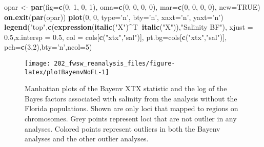 \documentclass[11pt,]{article}
\newenvironment{Shaded}{\begin{snugshade}}{\end{snugshade}}
\newcommand{\KeywordTok}[1]{\textcolor[rgb]{0.13,0.29,0.53}{\textbf{#1}}}
\newcommand{\DataTypeTok}[1]{\textcolor[rgb]{0.13,0.29,0.53}{#1}}
\newcommand{\DecValTok}[1]{\textcolor[rgb]{0.00,0.00,0.81}{#1}}
\newcommand{\FloatTok}[1]{\textcolor[rgb]{0.00,0.00,0.81}{#1}}
\newcommand{\StringTok}[1]{\textcolor[rgb]{0.31,0.60,0.02}{#1}}
\newcommand{\OtherTok}[1]{\textcolor[rgb]{0.56,0.35,0.01}{#1}}
\newcommand{\OperatorTok}[1]{\textcolor[rgb]{0.81,0.36,0.00}{\textbf{#1}}}
\newcommand{\NormalTok}[1]{#1}
\begin{document}
\begin{Shaded}
\begin{Highlighting}[]
\NormalTok{opar <-}\StringTok{ }\KeywordTok{par}\NormalTok{(}\DataTypeTok{fig=}\KeywordTok{c}\NormalTok{(}\DecValTok{0}\NormalTok{, }\DecValTok{1}\NormalTok{, }\DecValTok{0}\NormalTok{, }\DecValTok{1}\NormalTok{), }\DataTypeTok{oma=}\KeywordTok{c}\NormalTok{(}\DecValTok{0}\NormalTok{, }\DecValTok{0}\NormalTok{, }\DecValTok{0}\NormalTok{, }\DecValTok{0}\NormalTok{),}
            \DataTypeTok{mar=}\KeywordTok{c}\NormalTok{(}\DecValTok{0}\NormalTok{, }\DecValTok{0}\NormalTok{, }\DecValTok{0}\NormalTok{, }\DecValTok{0}\NormalTok{), }\DataTypeTok{new=}\OtherTok{TRUE}\NormalTok{)}
\KeywordTok{on.exit}\NormalTok{(}\KeywordTok{par}\NormalTok{(opar))}
\KeywordTok{plot}\NormalTok{(}\DecValTok{0}\NormalTok{, }\DecValTok{0}\NormalTok{, }\DataTypeTok{type=}\StringTok{'n'}\NormalTok{, }\DataTypeTok{bty=}\StringTok{'n'}\NormalTok{, }\DataTypeTok{xaxt=}\StringTok{'n'}\NormalTok{, }\DataTypeTok{yaxt=}\StringTok{'n'}\NormalTok{)}
\KeywordTok{legend}\NormalTok{(}\StringTok{"top"}\NormalTok{,}\KeywordTok{c}\NormalTok{(}\KeywordTok{expression}\NormalTok{(}\KeywordTok{italic}\NormalTok{(}\StringTok{"X"}\NormalTok{)}\OperatorTok{^}\NormalTok{T}\OperatorTok{~}\KeywordTok{italic}\NormalTok{(}\StringTok{"X"}\NormalTok{)),}\StringTok{"Salinity BF"}\NormalTok{),}
       \DataTypeTok{xjust =} \FloatTok{0.5}\NormalTok{,}\DataTypeTok{x.intersp =} \FloatTok{0.5}\NormalTok{,}
       \DataTypeTok{col =}\NormalTok{ cols[}\KeywordTok{c}\NormalTok{(}\StringTok{"xtx"}\NormalTok{,}\StringTok{"sal"}\NormalTok{)],}
       \DataTypeTok{pt.bg=}\NormalTok{cols[}\KeywordTok{c}\NormalTok{(}\StringTok{"xtx"}\NormalTok{,}\StringTok{"sal"}\NormalTok{)],}
       \DataTypeTok{pch=}\KeywordTok{c}\NormalTok{(}\DecValTok{3}\NormalTok{,}\DecValTok{2}\NormalTok{),}\DataTypeTok{bty=}\StringTok{'n'}\NormalTok{,}\DataTypeTok{ncol=}\DecValTok{5}\NormalTok{)}
\end{Highlighting}
\end{Shaded}

\begin{figure}[H]
\texttt{[image: 202\_fwsw\_reanalysis\_files/figure-latex/plotBayenvNoFL-1]} \caption{Manhattan plots of the Bayenv XTX statistic and the log of the Bayes factors associated with salinity from the analysis without the Florida populations. Shown are only loci that mapped to regions on chromosomes. Grey points represent loci that are not outlier in any analyses. Colored points represent outliers in both the Bayenv analyses and the other outlier analyses.}\label{fig:plotBayenvNoFL}
\end{figure}
\end{document}
